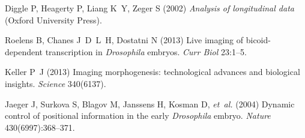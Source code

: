 \documentclass{pnastwo}
\begin{document}
\begin{article}





%
%

\begin{thebibliography}{10}

Diggle P, Heagerty P, Liang K~Y, Zeger S (2002) \textit{Analysis of
  longitudinal data} (Oxford University Press).

Roelens B, Chanes J~D~L~H, Dostatni N (2013) Live imaging of bicoid-dependent
  transcription in \textit{{D}rosophila} embryos. \textit{Curr Biol}
  23:1--5.

Keller P~J (2013) Imaging morphogenesis: technological advances and biological
  insights. \textit{Science} 340(6137).

Jaeger J, Surkova S, Blagov M, Janssens H, Kosman D, \textit{et~al.} (2004)
  Dynamic control of positional information in the early \textit{{D}rosophila}
  embryo. \textit{Nature} 430(6997):368--371.



\end{thebibliography}
\end{article}
\end{document}
